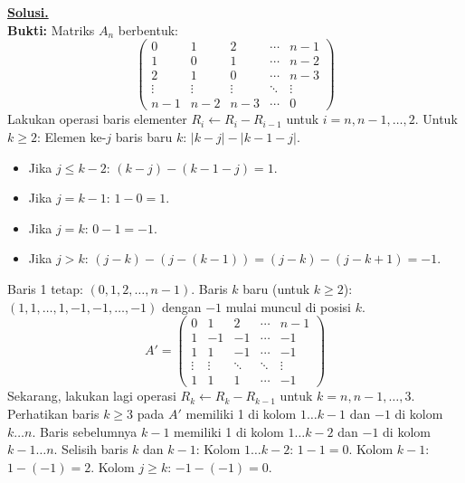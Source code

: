 \documentclass[12pt,twoside]{article}
\newenvironment{solution}
{
	\par\noindent\textbf{\underline{Solusi.}}\\
}
{
	\par
}
\begin{document}
\begin{enumerate}
\begin{solution}
          \textbf{Bukti:}
          Matriks $A_n$ berbentuk:
          \[
            \begin{pmatrix}
              0      & 1      & 2      & \cdots & n-1    \\
              1      & 0      & 1      & \cdots & n-2    \\
              2      & 1      & 0      & \cdots & n-3    \\
              \vdots & \vdots & \vdots & \ddots & \vdots \\
              n-1    & n-2    & n-3    & \cdots & 0
            \end{pmatrix}
          \]
          Lakukan operasi baris elementer $R_i \leftarrow R_i - R_{i-1}$ untuk $i=n, n-1, \dots, 2$.
          Untuk $k \ge 2$:
          Elemen ke-$j$ baris baru $k$: $|k-j| - |k-1-j|$.
          \begin{itemize}
            \item Jika $j \le k-2$: $(k-j) - (k-1-j) = 1$.
            \item Jika $j = k-1$: $1 - 0 = 1$.
            \item Jika $j = k$: $0 - 1 = -1$.
            \item Jika $j > k$: $(j-k) - (j-(k-1)) = (j-k) - (j-k+1) = -1$.
          \end{itemize}
          Baris 1 tetap: $(0, 1, 2, \dots, n-1)$.
          Baris $k$ baru (untuk $k \ge 2$): $(1, 1, \dots, 1, -1, -1, \dots, -1)$ dengan $-1$ mulai muncul di posisi $k$.
          \[
            A' = \begin{pmatrix}
              0      & 1      & 2      & \cdots & n-1    \\
              1      & -1     & -1     & \cdots & -1     \\
              1      & 1      & -1     & \cdots & -1     \\
              \vdots & \vdots & \ddots & \ddots & \vdots \\
              1      & 1      & 1      & \cdots & -1
            \end{pmatrix}
          \]
          Sekarang, lakukan lagi operasi $R_k \leftarrow R_k - R_{k-1}$ untuk $k=n, n-1, \dots, 3$.
          Perhatikan baris $k \ge 3$ pada $A'$ memiliki 1 di kolom $1 \dots k-1$ dan $-1$ di kolom $k \dots n$.
          Baris sebelumnya $k-1$ memiliki 1 di kolom $1 \dots k-2$ dan $-1$ di kolom $k-1 \dots n$.
          Selisih baris $k$ dan $k-1$:
          Kolom $1 \dots k-2$: $1-1=0$.
          Kolom $k-1$: $1-(-1)=2$.
          Kolom $j \ge k$: $-1-(-1)=0$.

\end{solution}
\end{enumerate}
\end{document}
